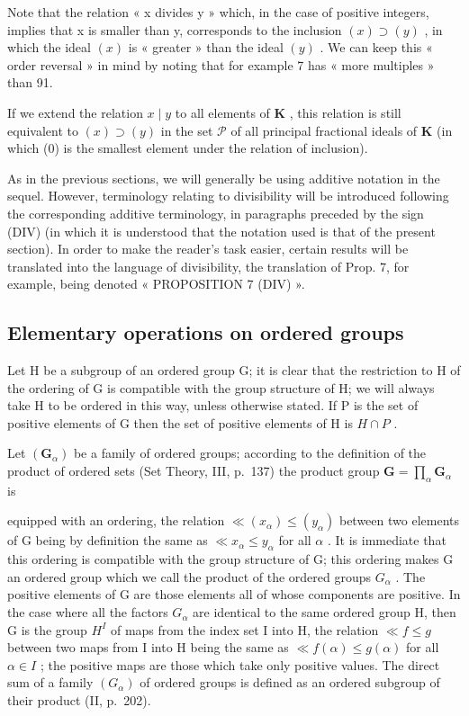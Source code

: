 Note that the relation « x divides y » which, in the case of positive integers, implies that x is smaller than y, corresponds to the inclusion \((x) \supset (y)\) , in which the ideal \((x)\) is « greater » than the ideal \((y)\) . We can keep this « order reversal » in mind by noting that for example 7 has « more multiples » than 91.

If we extend the relation \(x \mid y\) to all elements of \(\mathbf{K}\) , this relation is still equivalent to \((x) \supset (y)\) in the set \(\mathcal{P}\) of all principal fractional ideals of \(\mathbf{K}\) (in which (0) is the smallest element under the relation of inclusion).

As in the previous sections, we will generally be using additive notation in the sequel. However, terminology relating to divisibility will be introduced following the corresponding additive terminology, in paragraphs preceded by the sign (DIV) (in which it is understood that the notation used is that of the present section). In order to make the reader's task easier, certain results will be translated into the language of divisibility, the translation of Prop. 7, for example, being denoted « PROPOSITION 7 (DIV) ».

\subsection{Elementary operations on ordered groups}

Let H be a subgroup of an ordered group G; it is clear that the restriction to H of the ordering of G is compatible with the group structure of H; we will always take H to be ordered in this way, unless otherwise stated. If P is the set of positive elements of G then the set of positive elements of H is \(H \cap P\) .

Let \((\mathbf{G}_{\alpha})\) be a family of ordered groups; according to the definition of the product of ordered sets (Set Theory, III, p.~137) the product group \(\mathbf{G} = \prod_{\alpha}\mathbf{G}_{\alpha}\) is

equipped with an ordering, the relation \(\ll (x_{\alpha}) \leqslant (y_{\alpha})\) between two elements of G being by definition the same as \(\ll x_{\alpha} \leqslant y_{\alpha}\) for all \(\alpha\) . It is immediate that this ordering is compatible with the group structure of G; this ordering makes G an ordered group which we call the product of the ordered groups \(G_{\alpha}\) . The positive elements of G are those elements all of whose components are positive. In the case where all the factors \(G_{\alpha}\) are identical to the same ordered group H, then G is the group \(H^{I}\) of maps from the index set I into H, the relation \(\ll f \leqslant g\) between two maps from I into H being the same as \(\ll f(\alpha) \leqslant g(\alpha)\) for all \(\alpha \in I\) ; the positive maps are those which take only positive values. The direct sum of a family \((G_{\alpha})\) of ordered groups is defined as an ordered subgroup of their product (II, p.~202).

